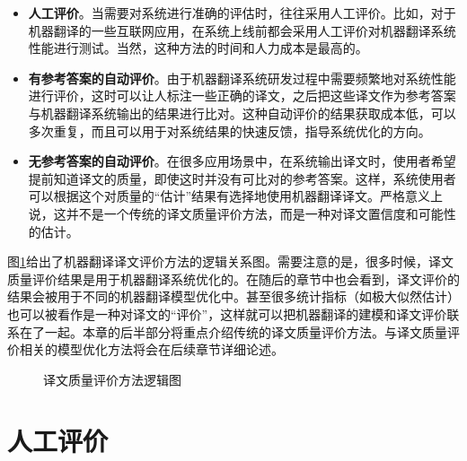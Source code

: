 \begin{itemize}
\vspace{0.5em}
\item {\small\sffamily\bfseries{人工评价}}。当需要对系统进行准确的评估时，往往采用人工评价。比如，对于机器翻译的一些互联网应用，在系统上线前都会采用人工评价对机器翻译系统性能进行测试。当然，这种方法的时间和人力成本是最高的。
\vspace{0.5em}
\item {\small\sffamily\bfseries{有参考答案的自动评价}}。由于机器翻译系统研发过程中需要频繁地对系统性能进行评价，这时可以让人标注一些正确的译文，之后把这些译文作为参考答案与机器翻译系统输出的结果进行比对。这种自动评价的结果获取成本低，可以多次重复，而且可以用于对系统结果的快速反馈，指导系统优化的方向。
\vspace{0.5em}
\item {\small\sffamily\bfseries{无参考答案的自动评价}}。在很多应用场景中，在系统输出译文时，使用者希望提前知道译文的质量，即使这时并没有可比对的参考答案。这样，系统使用者可以根据这个对质量的“估计”结果有选择地使用机器翻译译文。严格意义上说，这并不是一个传统的译文质量评价方法，而是一种对译文置信度和可能性的估计。
\vspace{0.5em}
\end{itemize}

\parinterval 图\ref{fig:4-2}给出了机器翻译译文评价方法的逻辑关系图。需要注意的是，很多时候，译文质量评价结果是用于机器翻译系统优化的。在随后的章节中也会看到，译文评价的结果会被用于不同的机器翻译模型优化中。甚至很多统计指标（如极大似然估计）也可以被看作是一种对译文的“评价”，这样就可以把机器翻译的建模和译文评价联系在了一起。本章的后半部分将重点介绍传统的译文质量评价方法。与译文质量评价相关的模型优化方法将会在后续章节详细论述。

\begin{figure}[htp]
    \centering
	
   \caption{译文质量评价方法逻辑图}
   \label{fig:4-2}
\end{figure}


\sectionnewpage
\section{人工评价}\label{Manual evaluation}

